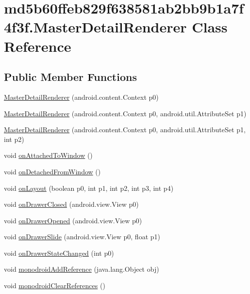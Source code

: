 \hypertarget{classmd5b60ffeb829f638581ab2bb9b1a7f4f3f_1_1_master_detail_renderer}{
\section{md5b60ffeb829f638581ab2bb9b1a7f4f3f.MasterDetailRenderer Class Reference}
\label{classmd5b60ffeb829f638581ab2bb9b1a7f4f3f_1_1_master_detail_renderer}
}
\subsection*{Public Member Functions}
\begin{CompactItemize}
\item 
\hyperlink{classmd5b60ffeb829f638581ab2bb9b1a7f4f3f_1_1_master_detail_renderer_14ed5c8eab58b78a200c47600daacb7b}{MasterDetailRenderer} (android.content.Context p0)
\item 
\hyperlink{classmd5b60ffeb829f638581ab2bb9b1a7f4f3f_1_1_master_detail_renderer_20b50dd51874695ded02789310f2c483}{MasterDetailRenderer} (android.content.Context p0, android.util.AttributeSet p1)
\item 
\hyperlink{classmd5b60ffeb829f638581ab2bb9b1a7f4f3f_1_1_master_detail_renderer_151e8a0190a84dac40712c929fe981f1}{MasterDetailRenderer} (android.content.Context p0, android.util.AttributeSet p1, int p2)
\item 
void \hyperlink{classmd5b60ffeb829f638581ab2bb9b1a7f4f3f_1_1_master_detail_renderer_cc8d8c4d884449690cd40a8f06d08aab}{onAttachedToWindow} ()
\item 
void \hyperlink{classmd5b60ffeb829f638581ab2bb9b1a7f4f3f_1_1_master_detail_renderer_01bbe4838a0a0c8ca1752f6a5ecd27b9}{onDetachedFromWindow} ()
\item 
void \hyperlink{classmd5b60ffeb829f638581ab2bb9b1a7f4f3f_1_1_master_detail_renderer_2a0acae4af9b3446d79e18c5f8817773}{onLayout} (boolean p0, int p1, int p2, int p3, int p4)
\item 
void \hyperlink{classmd5b60ffeb829f638581ab2bb9b1a7f4f3f_1_1_master_detail_renderer_7be721926ef6bb33d645447e19697a2a}{onDrawerClosed} (android.view.View p0)
\item 
void \hyperlink{classmd5b60ffeb829f638581ab2bb9b1a7f4f3f_1_1_master_detail_renderer_0e1ff8ec8ec5e237bd9237919be3bf13}{onDrawerOpened} (android.view.View p0)
\item 
void \hyperlink{classmd5b60ffeb829f638581ab2bb9b1a7f4f3f_1_1_master_detail_renderer_90e6dc6e5a16837cc5e5a625bfd14ba1}{onDrawerSlide} (android.view.View p0, float p1)
\item 
void \hyperlink{classmd5b60ffeb829f638581ab2bb9b1a7f4f3f_1_1_master_detail_renderer_076e7cfc3b531dbbb5ee5136cc89b3c2}{onDrawerStateChanged} (int p0)
\item 
void \hyperlink{classmd5b60ffeb829f638581ab2bb9b1a7f4f3f_1_1_master_detail_renderer_8ce806f10f46d2c5af92ef0c1b51986d}{monodroidAddReference} (java.lang.Object obj)
\item 
void \hyperlink{classmd5b60ffeb829f638581ab2bb9b1a7f4f3f_1_1_master_detail_renderer_4889caabc4556324a01473ea7ae71ecb}{monodroidClearReferences} ()
\end{CompactItemize}
